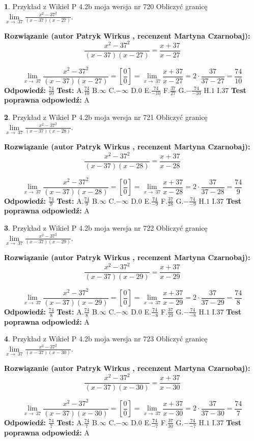 \documentclass[12pt, a4paper]{article}
\theoremstyle{definition} %
\newtheorem{zad}{}
\newcommand{\zadStart}[1]{\begin{zad}#1\newline}
\newcommand{\zadStop}{\end{zad}}
\newcommand{\rozwStart}[2]{\noindent \textbf{Rozwiązanie (autor #1 , recenzent #2): }\newline}
\newcommand{\rozwStop}{\newline}
\newcommand{\odpStart}{\noindent \textbf{Odpowiedź:}\newline}
\newcommand{\odpStop}{\newline}
\newcommand{\testStart}{\noindent \textbf{Test:}\newline}
\newcommand{\testStop}{\newline}
\newcommand{\kluczStart}{\noindent \textbf{Test poprawna odpowiedź:}\newline}
\newcommand{\kluczStop}{\newline}
\begin{document}
\zadStart{Przykład z Wikieł P 4.2b moja wersja nr 720}
Obliczyć granicę $\lim\limits_{x\to\ 37}\frac{x^{2}-37^{2}}{(x-37)(x-27)}$.
\zadStop
\rozwStart{Patryk Wirkus}{Martyna Czarnobaj}
$$\frac{x^{2}-37^{2}}{(x-37)(x-27)}=\frac{x+37}{x-27}$$

$$\lim\limits_{x\to\ 37}\frac{x^{2}-37^{2}}{(x-37)(x-27)}=[\frac{0}{0}]=\lim\limits_{x\to\ 37}\frac{x+37}{x-27}=2 \cdot \frac{37}{37-27} = \frac{74}{10}$$
\rozwStop
\odpStart
$\frac{74}{10}$
\odpStop
\testStart
A.$\frac{74}{10}$
B.$\infty$
C.$-\infty$
D.$0$
E.$\frac{74}{-10}$
F.$\frac{37}{27}$
G.$-\frac{74}{-10}$
H.$1$
I.$37$
\testStop
\kluczStart
A
\kluczStop



\zadStart{Przykład z Wikieł P 4.2b moja wersja nr 721}
Obliczyć granicę $\lim\limits_{x\to\ 37}\frac{x^{2}-37^{2}}{(x-37)(x-28)}$.
\zadStop
\rozwStart{Patryk Wirkus}{Martyna Czarnobaj}
$$\frac{x^{2}-37^{2}}{(x-37)(x-28)}=\frac{x+37}{x-28}$$

$$\lim\limits_{x\to\ 37}\frac{x^{2}-37^{2}}{(x-37)(x-28)}=[\frac{0}{0}]=\lim\limits_{x\to\ 37}\frac{x+37}{x-28}=2 \cdot \frac{37}{37-28} = \frac{74}{9}$$
\rozwStop
\odpStart
$\frac{74}{9}$
\odpStop
\testStart
A.$\frac{74}{9}$
B.$\infty$
C.$-\infty$
D.$0$
E.$\frac{74}{-9}$
F.$\frac{37}{28}$
G.$-\frac{74}{-9}$
H.$1$
I.$37$
\testStop
\kluczStart
A
\kluczStop



\zadStart{Przykład z Wikieł P 4.2b moja wersja nr 722}
Obliczyć granicę $\lim\limits_{x\to\ 37}\frac{x^{2}-37^{2}}{(x-37)(x-29)}$.
\zadStop
\rozwStart{Patryk Wirkus}{Martyna Czarnobaj}
$$\frac{x^{2}-37^{2}}{(x-37)(x-29)}=\frac{x+37}{x-29}$$

$$\lim\limits_{x\to\ 37}\frac{x^{2}-37^{2}}{(x-37)(x-29)}=[\frac{0}{0}]=\lim\limits_{x\to\ 37}\frac{x+37}{x-29}=2 \cdot \frac{37}{37-29} = \frac{74}{8}$$
\rozwStop
\odpStart
$\frac{74}{8}$
\odpStop
\testStart
A.$\frac{74}{8}$
B.$\infty$
C.$-\infty$
D.$0$
E.$\frac{74}{-8}$
F.$\frac{37}{29}$
G.$-\frac{74}{-8}$
H.$1$
I.$37$
\testStop
\kluczStart
A
\kluczStop



\zadStart{Przykład z Wikieł P 4.2b moja wersja nr 723}
Obliczyć granicę $\lim\limits_{x\to\ 37}\frac{x^{2}-37^{2}}{(x-37)(x-30)}$.
\zadStop
\rozwStart{Patryk Wirkus}{Martyna Czarnobaj}
$$\frac{x^{2}-37^{2}}{(x-37)(x-30)}=\frac{x+37}{x-30}$$

$$\lim\limits_{x\to\ 37}\frac{x^{2}-37^{2}}{(x-37)(x-30)}=[\frac{0}{0}]=\lim\limits_{x\to\ 37}\frac{x+37}{x-30}=2 \cdot \frac{37}{37-30} = \frac{74}{7}$$
\rozwStop
\odpStart
$\frac{74}{7}$
\odpStop
\testStart
A.$\frac{74}{7}$
B.$\infty$
C.$-\infty$
D.$0$
E.$\frac{74}{-7}$
F.$\frac{37}{30}$
G.$-\frac{74}{-7}$
H.$1$
I.$37$
\testStop
\kluczStart
A
\kluczStop
\end{document}
